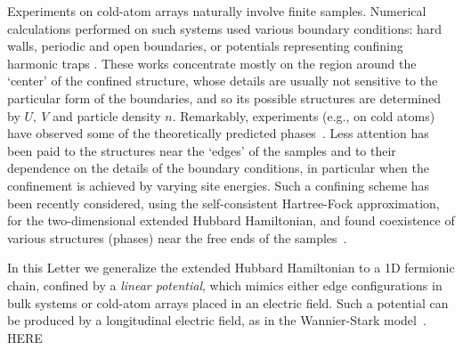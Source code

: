 \documentclass[aps,prl,showpacs,twocolumn,superscriptaddress]{revtex4-2}
\begin{document}
Experiments  on cold-atom arrays
naturally involve finite samples.  Numerical calculations  performed on such systems used various boundary conditions:
hard walls,  periodic and open boundaries, or potentials representing confining harmonic traps \cite{guan,parabola,heidrich}.
These works concentrate mostly on the region around the `center' of the confined structure, whose details are  usually not sensitive to the particular form of the boundaries, and so  its possible structures  are determined by  $U,~V$ and particle density $n$. Remarkably, experiments (e.g., on cold atoms) have observed some of the theoretically predicted phases~\cite{gross,greiner}.
 Less  attention has been paid to the structures near the `edges' of the samples and to their dependence on the details of the boundary conditions, in particular when the confinement is achieved by varying  site energies. Such a confining scheme has been recently considered,
using the self-consistent Hartree-Fock approximation, for the two-dimensional extended Hubbard Hamiltonian,
and found coexistence of various structures (phases) near the free ends of the samples~\cite{HF}.

In this Letter we generalize the extended Hubbard Hamiltonian to a 1D fermionic chain, confined by a {\it linear  potential}, which mimics either edge configurations in bulk systems or cold-atom arrays placed in an electric field. Such a potential can be produced by a longitudinal electric field, as in the Wannier-Stark model~\cite{stark}.
HERE
\end{document}

